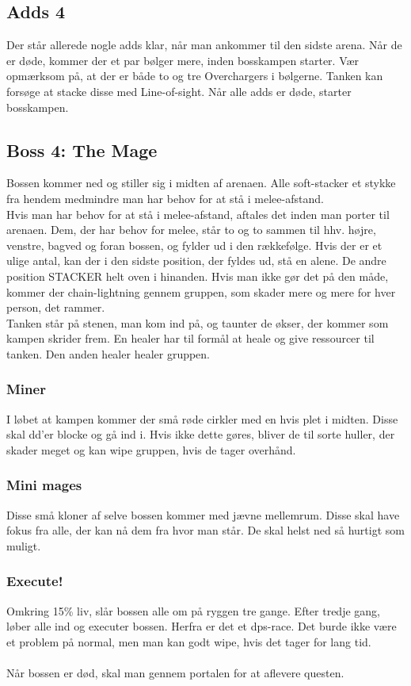 \subsection*{Adds 4}
Der står allerede nogle adds klar, når man ankommer til den sidste arena. Når
de er døde, kommer der et par bølger mere, inden bosskampen starter. Vær
opmærksom på, at der er både to og tre Overchargers i bølgerne. Tanken kan
forsøge at stacke disse med Line-of-sight. Når alle adds er døde, starter
bosskampen.
\subsection*{Boss 4: The Mage}
Bossen kommer ned og stiller sig i midten af arenaen. Alle soft-stacker et
stykke fra hendem medmindre man har behov for at stå i melee-afstand.\\
Hvis man
har behov for at stå i melee-afstand, aftales det inden man porter til arenaen.
Dem, der har behov for melee, står to og to sammen til hhv. højre, venstre,
bagved og foran bossen, og fylder ud i den rækkefølge. Hvis der er et ulige
antal, kan der i den sidste position, der fyldes ud, stå en alene. De andre
position STACKER helt oven i hinanden. Hvis man ikke gør det på den måde,
kommer der chain-lightning gennem gruppen, som skader mere og mere for hver
person, det rammer. \\
Tanken står på stenen, man kom ind på, og taunter de økser, der kommer som
kampen skrider frem. En healer har til formål at heale og give ressourcer til
tanken. Den anden healer healer gruppen.\\
\subsubsection*{Miner}
I løbet at kampen kommer der små røde cirkler med en hvis plet i midten. Disse
skal dd'er blocke og gå ind i. Hvis ikke dette gøres, bliver de til sorte
huller, der skader meget og kan wipe gruppen, hvis de tager overhånd.
\subsubsection*{Mini mages}
Disse små kloner af selve bossen kommer med jævne mellemrum. Disse skal have
fokus fra alle, der kan nå dem fra hvor man står. De skal helst ned så hurtigt
som muligt. 
\subsubsection*{Execute!}
Omkring 15\% liv, slår bossen alle om på ryggen tre gange. Efter tredje gang,
løber alle ind og executer bossen. Herfra er det et dps-race. Det burde ikke
være et problem på normal, men man kan godt wipe, hvis det tager for lang tid.
\\
\\
Når bossen er død, skal man gennem portalen for at aflevere questen.

